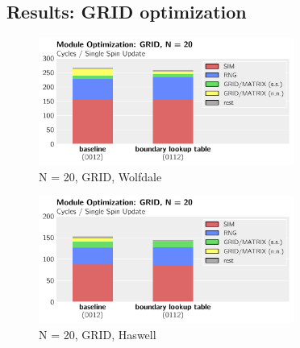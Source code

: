 \documentclass[letterpaper]{article}
\begin{document}
\subsection{Results: GRID optimization}
	\begin{figure}[h]\centering
	  \includegraphics[width = 8.36cm]{plots/msk_20_1.pdf}
	  \caption{N = 20, GRID, Wolfdale}
	\end{figure}
	\begin{figure}[h]\centering
	  \includegraphics[width = 8.36cm]{plots/dg_20_1.pdf}
	  \caption{N = 20, GRID, Haswell}
	\end{figure}
\end{document}
